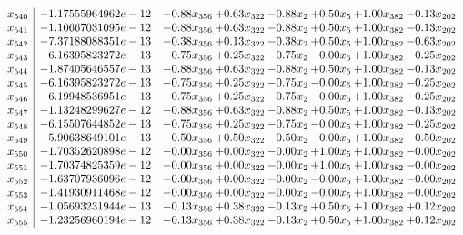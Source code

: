 \documentclass[8pt]{article}
\begin{document}
\[\begin{array}{c| c c@{\hskip 2pt} c@{\hskip 2pt} c@{\hskip 2pt} c@{\hskip 2pt} c@{\hskip 2pt} c@{\hskip 2pt} }
 x_{540}   &  -1.17555964962e-12 & -0.88 x_{356} & +  0.63 x_{322} & -0.88 x_{2} & +  0.50 x_{5} & +  1.00 x_{382} & -0.13 x_{202}\\
 x_{541}   &  -1.10667031095e-12 & -0.88 x_{356} & +  0.63 x_{322} & -0.88 x_{2} & +  0.50 x_{5} & +  1.00 x_{382} & -0.13 x_{202}\\
 x_{542}   &  -7.37188088351e-13 & -0.38 x_{356} & +  0.13 x_{322} & -0.38 x_{2} & +  0.50 x_{5} & +  1.00 x_{382} & -0.63 x_{202}\\
 x_{543}   &  -6.16395823272e-13 & -0.75 x_{356} & +  0.25 x_{322} & -0.75 x_{2} & -0.00 x_{5} & +  1.00 x_{382} & -0.25 x_{202}\\
 x_{544}   &  -1.87405646557e-13 & -0.88 x_{356} & +  0.63 x_{322} & -0.88 x_{2} & +  0.50 x_{5} & +  1.00 x_{382} & -0.13 x_{202}\\
 x_{545}   &  -6.16395823272e-13 & -0.75 x_{356} & +  0.25 x_{322} & -0.75 x_{2} & -0.00 x_{5} & +  1.00 x_{382} & -0.25 x_{202}\\
 x_{546}   &  -6.19948536951e-13 & -0.75 x_{356} & +  0.25 x_{322} & -0.75 x_{2} & -0.00 x_{5} & +  1.00 x_{382} & -0.25 x_{202}\\
 x_{547}   &  -1.13248299627e-12 & -0.88 x_{356} & +  0.63 x_{322} & -0.88 x_{2} & +  0.50 x_{5} & +  1.00 x_{382} & -0.13 x_{202}\\
 x_{548}   &  -6.15507644852e-13 & -0.75 x_{356} & +  0.25 x_{322} & -0.75 x_{2} & -0.00 x_{5} & +  1.00 x_{382} & -0.25 x_{202}\\
 x_{549}   &  -5.90638649101e-13 & -0.50 x_{356} & +  0.50 x_{322} & -0.50 x_{2} & -0.00 x_{5} & +  1.00 x_{382} & -0.50 x_{202}\\
 x_{550}   &  -1.70352620898e-12 & -0.00 x_{356} & +  0.00 x_{322} & -0.00 x_{2} & +  1.00 x_{5} & +  1.00 x_{382} & -0.00 x_{202}\\
 x_{551}   &  -1.70374825359e-12 & -0.00 x_{356} & +  0.00 x_{322} & -0.00 x_{2} & +  1.00 x_{5} & +  1.00 x_{382} & -0.00 x_{202}\\
 x_{552}   &  -1.63707936096e-12 & -0.00 x_{356} & +  0.00 x_{322} & -0.00 x_{2} & -0.00 x_{5} & +  1.00 x_{382} & -0.00 x_{202}\\
 x_{553}   &  -1.41930911468e-12 & -0.00 x_{356} & +  0.00 x_{322} & -0.00 x_{2} & -0.00 x_{5} & +  1.00 x_{382} & -0.00 x_{202}\\
 x_{554}   &  -1.05693231944e-13 & -0.13 x_{356} & +  0.38 x_{322} & -0.13 x_{2} & +  0.50 x_{5} & +  1.00 x_{382} & +  0.12 x_{202}\\
 x_{555}   &  -1.23256960194e-12 & -0.13 x_{356} & +  0.38 x_{322} & -0.13 x_{2} & +  0.50 x_{5} & +  1.00 x_{382} & +  0.12 x_{202}\\

\end{array}\]
\end{document}
